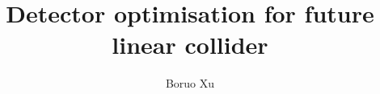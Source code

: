 \documentclass[hyperpdf,bindnopdf]{hepthesis}
\title{Detector optimisation for future linear collider}
\author{Boruo Xu}
\begin{document}
\begin{frontmatter}
  
\end{frontmatter}

\begin{mainmatter}
  
  
  
  
  
  
 
\end{mainmatter}

\begin{appendices}
\end{appendices}

\begin{backmatter}
  
\end{backmatter}

\end{document}
